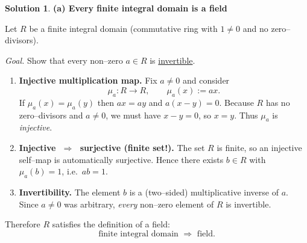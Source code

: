 \documentclass[12pt]{article}
\theoremstyle{definition} %
\newtheorem{solution}{Solution}
\theoremstyle{plain} %
\begin{document}
                  \begin{solution}
                    \textbf{(a)  Every finite integral domain is a field}
                    
                    Let $R$ be a finite integral domain (commutative ring with $1\neq 0$ and
                    no zero–divisors).
                    
                    \smallskip
                    \emph{Goal.}  Show that every non–zero $a\in R$ is \underline{invertible}.
                    
                    \begin{enumerate}[label=\textit{Step \arabic*:},wide,labelwidth=0pt,labelsep=.8em]
                        \item \textbf{Injective multiplication map.}
                              Fix $a\neq 0$ and consider  
                              \[
                                  \mu_{a} : R \longrightarrow R, 
                                  \qquad
                                  \mu_{a}(x):=ax .
                              \]
                              If $\mu_{a}(x)=\mu_{a}(y)$ then $ax=ay$ and
                              $a(x-y)=0$.  
                              Because $R$ has no zero–divisors and $a\neq 0$, we must
                              have $x-y=0$, so $x=y$.  
                              Thus $\mu_{a}$ is \emph{injective}.
                    
                        \item \textbf{Injective $\;\Rightarrow\;$ surjective (finite set!).}
                              The set $R$ is finite, so an injective self–map is automatically
                              surjective.  
                              Hence there exists $b\in R$ with $\mu_{a}(b)=1$, i.e.\ $ab=1$.
                    
                        \item \textbf{Invertibility.}
                              The element $b$ is a (two–sided) multiplicative inverse of $a$.
                              Since $a\neq 0$ was arbitrary, \emph{every} non–zero element of
                              $R$ is invertible.
                    \end{enumerate}
                    
                    Therefore $R$ satisfies the definition of a field:
                    \[
                       \boxed{\text{finite integral domain } \Longrightarrow \text{ field}.}
                    \]
                    

\end{solution}
\end{document}
